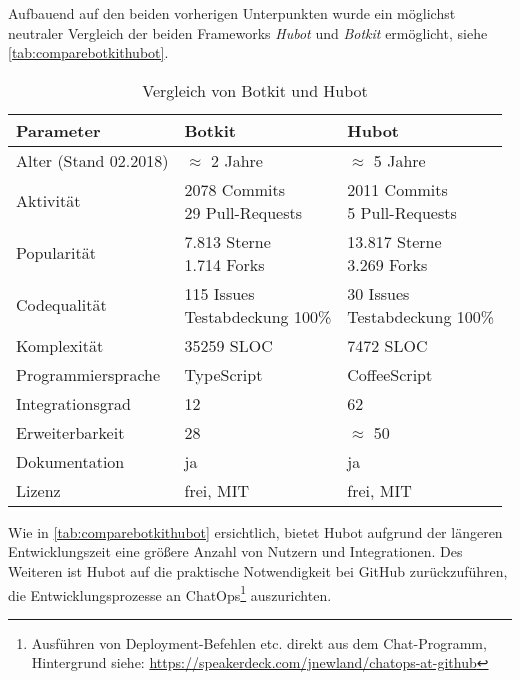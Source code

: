 Aufbauend auf den beiden vorherigen Unterpunkten wurde ein möglichst neutraler Vergleich der beiden Frameworks \textit{Hubot} und \textit{Botkit} ermöglicht, siehe \autoref{tab:comparebotkithubot}.

\begin{table}[htbp]
    \centering
    \begin{tabularx}{\textwidth}{|l|X|X|}
        \hline
        \textbf{Parameter} & \textbf{Botkit} & \textbf{Hubot} \\
        \hline
        Alter (Stand 02.2018) & $\approx$ 2 Jahre & $\approx$ 5 Jahre \\
        \hline
        Aktivität & \makecell[l]{2078 Commits\\ 29 Pull-Requests} & \makecell[l]{2011 Commits\\ 5 Pull-Requests} \\
        \hline
        Popularität & \makecell[l]{7.813 Sterne\\ 1.714 Forks} & \makecell[l]{13.817 Sterne\\ 3.269 Forks} \\
        \hline
        Codequalität & \makecell[l]{115 Issues\\ Testabdeckung 100\%} & \makecell[l]{30 Issues\\ Testabdeckung 100\%} \\
        \hline
        Komplexität & 35259 SLOC & 7472 SLOC \\
        \hline
        Programmiersprache & TypeScript & CoffeeScript \\
        \hline
        Integrationsgrad & 12 & 62 \\
        \hline
        Erweiterbarkeit & 28 & $\approx$ 50 \\
        \hline
        Dokumentation & ja & ja \\
        \hline
        Lizenz & frei, MIT & frei, MIT \\
        \hline
    \end{tabularx}
    \caption{Vergleich von Botkit und Hubot}
    \label{tab:comparebotkithubot}
\end{table}


Wie in \autoref{tab:comparebotkithubot} ersichtlich, bietet Hubot aufgrund der längeren Entwicklungszeit eine größere Anzahl von Nutzern und Integrationen. Des Weiteren ist Hubot auf die praktische Notwendigkeit bei GitHub zurückzuführen, die Entwicklungsprozesse an ChatOps\footnote{Ausführen von Deployment-Befehlen etc. direkt aus dem Chat-Programm, Hintergrund siehe: \url{https://speakerdeck.com/jnewland/chatops-at-github}} auszurichten.

